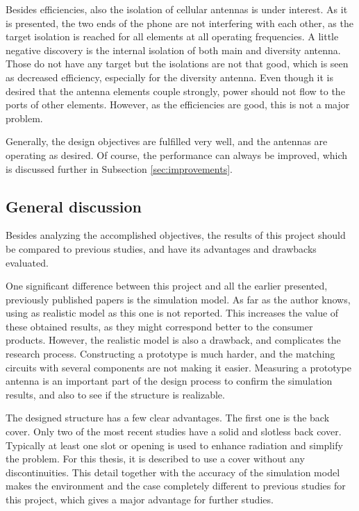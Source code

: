 Besides efficiencies, also the isolation of cellular antennas is under interest. As it is presented, the two ends of the phone are not interfering with each other, as the target isolation is reached for all elements at all operating frequencies. A little negative discovery is the internal isolation of both main and diversity antenna. Those do not have any target but the isolations are not that good, which is seen as decreased efficiency, especially for the diversity antenna. Even though it is desired that the antenna elements couple strongly, power should not flow to the ports of other elements. However, as the efficiencies are good, this is not a major problem.

Generally, the design objectives are fulfilled very well, and the antennas are operating as desired. Of course, the performance can always be improved, which is discussed further in Subsection \ref{sec:improvements}.


\subsection{General discussion}
\label{sec:general_discussion}
Besides analyzing the accomplished objectives, the results of this project should be compared to previous studies, and have its advantages and drawbacks evaluated.

One significant difference between this project and all the earlier presented, previously published papers is the simulation model. As far as the author knows, using as realistic model as this one is not reported. This increases the value of these obtained results, as they might correspond better to the consumer products. However, the realistic model is also a drawback, and complicates the research process. Constructing a prototype is much harder, and the matching circuits with several components are not making it easier. Measuring a prototype antenna is an important part of the design process to confirm the simulation results, and also to see if the structure is realizable.

The designed structure has a few clear advantages. The first one is the back cover. Only two of the most recent studies have a solid and slotless back cover. Typically at least one slot or opening is used to enhance radiation and simplify the problem. For this thesis, it is described to use a cover without any discontinuities. This detail together with the accuracy of the simulation model makes the environment and the case completely different to previous studies for this project, which gives a major advantage for further studies. 


